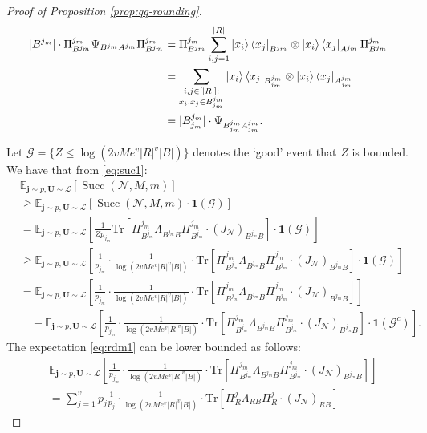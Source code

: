 \documentclass[a4paper,onecolumn,11pt,accepted=2025-10-01]{quantumarticle}
\DeclareMathOperator{\suc}{Succ}
\newcommand*{\bid}{\mathbf{1}}
\newcommand*{\cG}{\mathcal{G}}
\newcommand*{\cN}{\mathcal{N}}
\newcommand*{\cL}{\mathcal{L}}
\newcommand*{\tr}[1]{\mathrm{Tr}\left[#1\right]}
\newcommand*{\exs}[2]{\mathbb{E}_{#1}\left[#2 \right]}
\begin{document}
\begin{proof}[Proof of Proposition \ref{prop:qq-rounding}]
\begin{align}
   |B^{j_m}|\cdot  \Pi_{B^{j_m}}^{j_m}  \Psi_{B^{j_m}A^{j_m}}\Pi_{B^{j_m}}^{j_m}  &= \Pi_{B^{j_m}}^{j_m}\sum_{i,j=1}^{|R|} \ket{x_i}\bra{x_j}_{B^{j_m}} \otimes \ket{x_i}\bra{x_j}_{A^{j_m}}\Pi_{B^{j_m}}^{j_m}
    \\&= \sum_{\substack{i,j \in [|R|]: \\ x_i,x_j \in B_{j_m}^{j_m}}} \ket{x_i}\bra{x_j}_{B_{j_m}^{j_m}} \otimes \ket{x_i}\bra{x_j}_{A_{j_m}^{j_m}}
    \\&= |B_{j_m}^{j_m}|\cdot \Psi_{B_{j_m}^{j_m}A_{j_m}^{j_m}}.
\end{align}

Let $\cG=\{Z\le \log(2v M e^{v}|R|^{v}|B|)\}$ denotes the ‘good' event that $Z$ is bounded. We have that from \eqref{eq:suc1}:
\begin{align}
    &\exs{\bm{j}\sim p, \bm{U}\sim \cL}{\suc(\cN, M, m)}
    \\&\ge  \exs{\bm{j}\sim p, \bm{U}\sim \cL}{\suc(\cN, M, m)\cdot \bid(\cG)}
    \\&= \exs{\bm{j}\sim p, \bm{U}\sim \cL}{\tfrac{1}{Zp_{j_m}}\tr{ \Pi_{B^{j_m}}^{j_m} \Lambda_{B^{j_m} B} \Pi_{B^{j_m}}^{j_m} \cdot (J_{\cN})_{B^{j_m} B} }\cdot \bid(\cG)}
    \\&\ge  \exs{\bm{j}\sim p, \bm{U}\sim \cL}{\frac{1}{p_{j_m}}\cdot\frac{1}{\log(2v M e^{v}|R|^{v}|B|)}\cdot \tr{ \Pi_{B^{j_m}}^{j_m} \Lambda_{B^{j_m} B} \Pi_{B^{j_m}}^{j_m} \cdot(J_{\cN})_{B^{j_m} B} }\cdot \bid(\cG)}
     \\&=  \exs{\bm{j}\sim p, \bm{U}\sim \cL}{\frac{1}{p_{j_m}}\cdot\frac{1}{\log(2v M e^{v}|R|^{v}|B|)}\cdot \tr{ \Pi_{B^{j_m}}^{j_m} \Lambda_{B^{j_m} B} \Pi_{B^{j_m}}^{j_m} \cdot(J_{\cN})_{B^{j_m} B} }}\label{eq:rdm1}
      \\&\quad -  \exs{\bm{j}\sim p, \bm{U}\sim \cL}{\frac{1}{p_{j_m}}\cdot\frac{1}{\log(2v M e^{v}|R|^{v}|B|)}\cdot \tr{ \Pi_{B^{j_m}}^{j_m} \Lambda_{B^{j_m} B} \Pi_{B^{j_m}}^{j_m} \cdot(J_{\cN})_{B^{j_m} B} }\cdot \bid(\cG^c)}.\label{eq:rdm2}
\end{align}
The expectation \eqref{eq:rdm1} can be lower bounded as follows:
\begin{align}
    &\exs{\bm{j}\sim p, \bm{U}\sim \cL}{\frac{1}{p_{j_m}}\cdot\frac{1}{\log(2v M e^{v}|R|^{v}|B|)}\cdot \tr{ \Pi_{B^{j_m}}^{j_m} \Lambda_{B^{j_m} B} \Pi_{B^{j_m}}^{j_m} \cdot(J_{\cN})_{B^{j_m} B} }}
     \\& =\sum_{j=1}^{v} p_j \frac{1}{p_{j}}\cdot\frac{1}{\log(2v M e^{v}|R|^{v}|B|)} \cdot \tr{ \Pi^{j}_R \Lambda_{R B} \Pi^{j}_R \cdot(J_{\cN})_{RB} }

\end{align}
\end{proof}
\end{document}
